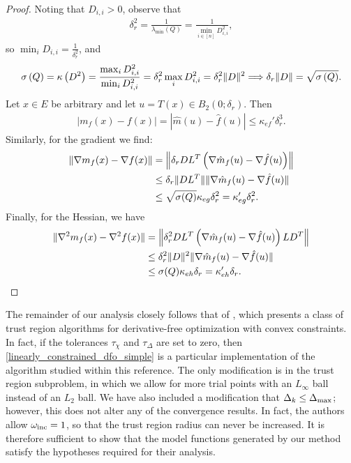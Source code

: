 \documentclass{article}
\begin{document}
\begin{proof}


Noting that $D_{i, i} > 0$, observe that
\begin{align*}
\delta_r^2 = \frac {1} {\lambda_{\text{min}}\left(Q\right)} = \frac {1} {\min_{i \in [n]} D^2_{i, i}},
\end{align*}
so $\min_{i} D_{i, i} = \frac{1}{\delta_r^2}$, and
\begin{align*}
{\sigma}\left(Q\right)
= \kappa\left(D^2\right) 
= \frac{\max_{i}D_{i,i}^2}{\min_{i}D_{i,i}^2} 
= \delta_r^2 \max_{i}D_{i,i}^2 = \delta_r^2\|D\|^2
\Longrightarrow \delta_r \|D\| = \sqrt{{\sigma}\left(Q\right)}.
\end{align*}
Let $x \in E$ be arbitrary and let $u = T(x) \in B_2(0;\delta_r)$.
Then
\begin{align*}
 | m_f(x) - f(x)| = |\hat m(u) - \hat f(u)| \le \kappa_{ef}'\delta_r^3.
\end{align*}
Similarly, for the gradient we find:
\begin{align*}
\| \nabla m_f(x) - \nabla f(x)\| &= \left\|\delta_rDL^T\left(\nabla\hat m_f(u) - \nabla \hat f(u)\right)\right\| \\
& \le \delta_r \|DL^T\|\|\nabla \hat m_f(u) - \nabla \hat f(u)\| \\
& \le \sqrt{{\sigma}(Q)}\kappa_{eg} \delta_r^2 = \kappa_{eg}' \delta_r^2.
\end{align*}
Finally,  for the Hessian, we have
\begin{align*}
\| \nabla^2 m_f(x) - \nabla^2 f(x)\| & = \left\|\delta_r^2DL^T\left(\nabla\hat m_f(u) - \nabla \hat f(u)\right)LD^T\right\| \\
& \le \delta_r^2 \|D\|^2\|\nabla \hat m_f(u) - \nabla \hat f(u)\| \\
& \le {\sigma}(Q)\kappa_{eh} \delta_r = \kappa_{eh}' \delta_r.
\end{align*}

\end{proof}

The remainder of our analysis closely follows that of \cite{Conejo:2013:GCT:2620806.2621814},
which presents a class of trust region algorithms for derivative-free optimization with convex constraints.
In fact, if the tolerances $\tau_{\chi}$ and $\tau_{\Delta}$ are set to zero,  
then \cref{linearly_constrained_dfo_simple} is a particular implementation of the algorithm studied within this reference.
The only modification is in the trust region subproblem, in which we allow for more trial points with an $L_{\infty}$ ball instead of an $L_2$ ball.
We have also included a modification that $\Delta_k \le {\Delta_{\textrm{max}}}$; however, this does not alter any of the convergence results.  In fact, the authors allow $\omega_{\text{inc}} = 1$, so that the trust region radius can never be increased.
It is therefore sufficient to show that the model functions generated by our method satisfy the hypotheses required for their analysis.
\end{document}
